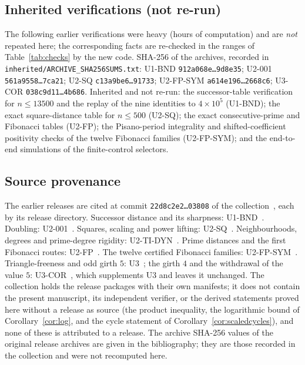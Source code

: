 \subsection{Inherited verifications (not re-run)}
The following earlier verifications were heavy (hours of computation) and are \emph{not} repeated here; the corresponding facts are re-checked in the ranges of Table~\ref{tab:checks} by the new code. SHA-256 of the archives, recorded in \texttt{inherited/ARCHIVE\_SHA256SUMS.txt}: U1-BND \texttt{912a068e\dots9d8e35}; U2-001 \texttt{561a9558\dots7ca21}; U2-SQ \texttt{c13a9be6\dots91733}; U2-FP-SYM \texttt{a614e196\dots2668c6}; U3-COR \texttt{038c9d11\dots4b686}. Inherited and not re-run: the successor-table verification for $n\le13500$ and the replay of the nine identities to $4\times10^5$ (U1-BND); the exact square-distance table for $n\le500$ (U2-SQ); the exact consecutive-prime and Fibonacci tables (U2-FP); the Pisano-period integrality and shifted-coefficient positivity checks of the twelve Fibonacci families (U2-FP-SYM); and the end-to-end simulations of the finite-control selectors.

\subsection{Source provenance}\label{ssec:provenance}
The earlier releases are cited at commit \texttt{22d8c2e2\dots03808} of the collection~\cite{coll}, each by its release directory. Successor distance and its sharpness: U1-BND~\cite{u1bnd}. Doubling: U2-001~\cite{u2}. Squares, scaling and power lifting: U2-SQ~\cite{u2sq}. Neighbourhoods, degrees and prime-degree rigidity: U2-TI-DYN~\cite{u2tidyn}. Prime distances and the first Fibonacci routes: U2-FP~\cite{u2fp}. The twelve certified Fibonacci families: U2-FP-SYM~\cite{u2fpsym}. Triangle-freeness and odd girth $5$: U3~\cite{u3}; the girth $4$ and the withdrawal of the value $5$: U3-COR~\cite{u3cor}, which supplements U3 and leaves it unchanged. The collection holds the release packages with their own manifests; it does not contain the present manuscript, its independent verifier, or the derived statements proved here without a release as source (the product inequality, the logarithmic bound of Corollary~\ref{cor:log}, and the cycle statement of Corollary~\ref{cor:scaledcycles}), and none of these is attributed to a release. The archive SHA-256 values of the original release archives are given in the bibliography; they are those recorded in the collection and were not recomputed here.

